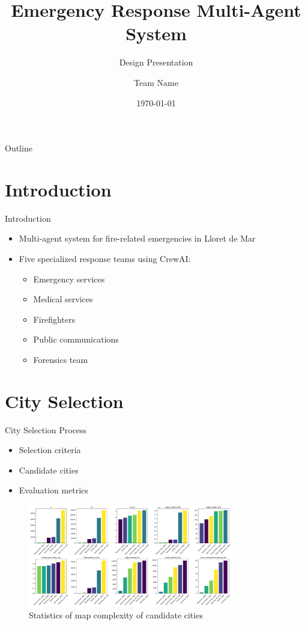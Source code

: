 \documentclass{beamer}
\title{Emergency Response Multi-Agent System}
\subtitle{Design Presentation}
\author{Team Name}
\date{\today}
\begin{document}
\begin{frame}
    \titlepage
\end{frame}

\begin{frame}{Outline}
    \tableofcontents
\end{frame}

\section{Introduction}
\begin{frame}{Introduction}
    \begin{itemize}
        \item Multi-agent system for fire-related emergencies in Lloret de Mar
        \item Five specialized response teams using CrewAI:
        \begin{itemize}
            \item Emergency services
            \item Medical services
            \item Firefighters
            \item Public communications
            \item Forensics team
        \end{itemize}
    \end{itemize}
\end{frame}

\section{City Selection}
\begin{frame}{City Selection Process}
    \begin{itemize}
        \item Selection criteria
        \item Candidate cities
        \item Evaluation metrics
    \end{itemize}
    \begin{figure}[H]
        \centering
        \includegraphics[width=0.8\textwidth]{../figures/map_complexity_statistics.png}
        \caption{Statistics of map complexity of candidate cities}
    \end{figure}
\end{frame}
\end{document}
